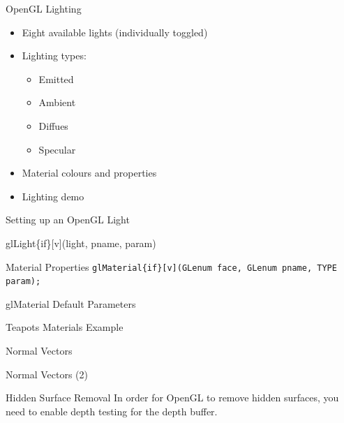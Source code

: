 \documentclass[xcolor=dvipsnames,t]{beamer}
\newcommand{\showcode}[1]{\begin{mdframed}[style=code] %
                          \end{mdframed}%
}
\begin{document}
\begin{frame}{OpenGL Lighting} 
    \begin{itemize} 
        \item Eight available lights (individually toggled)
        \item Lighting types:
        \begin{itemize} 
            \item Emitted
            \item Ambient
            \item Diffues
            \item Specular
        \end{itemize} 
        \item Material colours and properties
        \item Lighting demo
    \end{itemize} 
\end{frame} 

\begin{frame}{Setting up an OpenGL Light}
    \showcode{light.c} 
\end{frame} 

\begin{frame}{glLight\{if\}[v](light, pname, param)}
\end{frame} 

\begin{frame}{Material Properties} 
    \texttt{glMaterial\{if\}[v](GLenum face, GLenum pname, TYPE param);} 
    \showcode{material.c} 
\end{frame} 

\begin{frame}{glMaterial Default Parameters} 
\end{frame} 

\begin{frame}{Teapots Materials Example} 
\end{frame} 

\begin{frame}{Normal Vectors} 
    \showcode{normals.c} 
\end{frame} 

\begin{frame}{Normal Vectors (2)}
\end{frame} 

\begin{frame}{Hidden Surface Removal} 
    In order for OpenGL to remove hidden surfaces, 
    you need to enable depth testing for the depth buffer.
    \showcode{hidden.c} 
\end{frame} 
\end{document}
